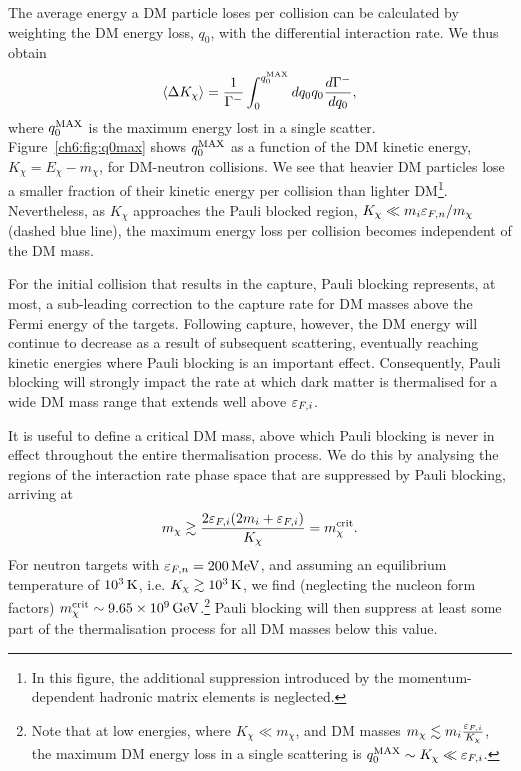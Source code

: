 The average energy a DM particle loses per collision can be calculated by weighting the DM energy loss, $q_0$, with the differential interaction rate. We thus obtain
\begin{equation}
  \langle \Delta K_\chi\rangle = \frac{1}{\Gamma^{-}} \int_{0}^{q_0^{\rm MAX}} dq_0 q_0  \frac{d\Gamma^-}{dq_0}, 
\end{equation}
where $q_0^{\rm MAX}$ is the maximum energy lost in a single scatter. 
Figure~\ref{ch6:fig:q0max} shows $q_0^{\rm MAX}$ as a function of the DM kinetic energy, $K_\chi=E_\chi-m_\chi$, for DM-neutron collisions. We see that heavier DM particles lose a smaller fraction of their kinetic energy per collision than lighter DM\footnote{In this figure, the additional suppression introduced by the momentum-dependent hadronic matrix elements is neglected.}.  
Nevertheless, as $K_\chi$ approaches the Pauli blocked region, $K_\chi \ll m_i \varepsilon_{F,n}/m_\chi$ (dashed blue line), the maximum energy loss per collision becomes independent of the DM mass. 


For the initial collision that results in the capture, Pauli blocking represents, at most, a sub-leading correction to the capture rate for DM masses above the Fermi energy of the targets. 
Following capture, however, the DM energy will continue to decrease as a result of subsequent scattering, eventually reaching kinetic energies where Pauli blocking is an important effect. Consequently, Pauli blocking will strongly impact the rate at which dark matter is thermalised for a wide DM mass range that extends well above $\varepsilon_{F,i}$.  


It is useful to define a critical DM mass, above which Pauli blocking is never in effect throughout the entire thermalisation process. We do this by analysing the regions of the interaction rate phase space that are suppressed by Pauli blocking, arriving at
\begin{equation}
  m_\chi \gtrsim \frac{2\varepsilon_{F,i}(2 m_i + \varepsilon_{F,i})}{K_\chi} =m_\chi^{\rm crit}. 
  \label{ch6:eq:mucrit}
\end{equation}
For neutron targets with $\varepsilon_{F,n}=200{\rm \,MeV}$, and assuming an equilibrium temperature of $10^3{\rm \,K}$, i.e. $K_\chi \gtrsim 10^3 {\rm \,K}$, we find (neglecting the nucleon form factors) $m_\chi^{\rm crit} \sim 9.65\times 10^9{\rm \,GeV}$.\footnote{Note that at low energies, where $K_\chi \ll m_\chi$, and DM masses  $m_\chi\lesssim m_i \frac{\varepsilon_{F,i}}{K_\chi}$,  the maximum DM energy loss in a single scattering is $q_0^{\rm MAX}\sim K_\chi\ll\varepsilon_{F,i}$.} 
Pauli blocking will then suppress at least some part of the thermalisation process for all DM masses below this value. 


